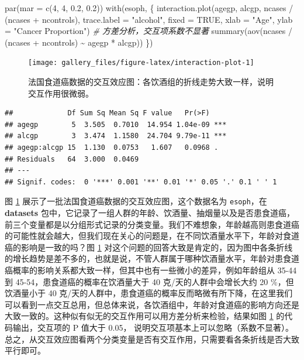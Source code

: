 \documentclass[
  b5paper,
  UTF8,twoside]{book}
\newenvironment{Shaded}{\begin{snugshade}}{\end{snugshade}}
\newcommand{\AttributeTok}[1]{\textcolor[rgb]{0.77,0.63,0.00}{#1}}
\newcommand{\CommentTok}[1]{\textcolor[rgb]{0.56,0.35,0.01}{\textit{#1}}}
\newcommand{\ConstantTok}[1]{\textcolor[rgb]{0.00,0.00,0.00}{#1}}
\newcommand{\DecValTok}[1]{\textcolor[rgb]{0.00,0.00,0.81}{#1}}
\newcommand{\FloatTok}[1]{\textcolor[rgb]{0.00,0.00,0.81}{#1}}
\newcommand{\FunctionTok}[1]{\textcolor[rgb]{0.00,0.00,0.00}{#1}}
\newcommand{\NormalTok}[1]{#1}
\newcommand{\SpecialCharTok}[1]{\textcolor[rgb]{0.00,0.00,0.00}{#1}}
\newcommand{\StringTok}[1]{\textcolor[rgb]{0.31,0.60,0.02}{#1}}
\begin{document}
\begin{Shaded}
\begin{Highlighting}[]
\FunctionTok{par}\NormalTok{(}\AttributeTok{mar =} \FunctionTok{c}\NormalTok{(}\DecValTok{4}\NormalTok{, }\DecValTok{4}\NormalTok{, }\FloatTok{0.2}\NormalTok{, }\FloatTok{0.2}\NormalTok{))}
\FunctionTok{with}\NormalTok{(esoph, \{}
  \FunctionTok{interaction.plot}\NormalTok{(agegp, alcgp, ncases }\SpecialCharTok{/}\NormalTok{ (ncases }\SpecialCharTok{+}\NormalTok{ ncontrols), }\AttributeTok{trace.label =} \StringTok{"alcohol"}\NormalTok{,}
                   \AttributeTok{fixed =} \ConstantTok{TRUE}\NormalTok{, }\AttributeTok{xlab =} \StringTok{"Age"}\NormalTok{, }\AttributeTok{ylab =} \StringTok{"Cancer Proportion"}\NormalTok{)}
  \CommentTok{\# 方差分析，交互项系数不显著}
  \FunctionTok{summary}\NormalTok{(}\FunctionTok{aov}\NormalTok{(ncases }\SpecialCharTok{/}\NormalTok{ (ncases }\SpecialCharTok{+}\NormalTok{ ncontrols) }\SpecialCharTok{\textasciitilde{}}\NormalTok{ agegp }\SpecialCharTok{*}\NormalTok{ alcgp))}
\NormalTok{\})}
\end{Highlighting}
\end{Shaded}

\begin{figure}

{\centering \texttt{[image: gallery\_files/figure-latex/interaction-plot-1]} 

}

\caption[法国食道癌数据的交互效应图]{法国食道癌数据的交互效应图：各饮酒组的折线走势大致一样，说明交互作用很微弱。}\label{fig:interaction-plot}
\end{figure}

\begin{verbatim}
##             Df Sum Sq Mean Sq F value   Pr(>F)    
## agegp        5  3.505  0.7010  14.954 1.04e-09 ***
## alcgp        3  3.474  1.1580  24.704 9.79e-11 ***
## agegp:alcgp 15  1.130  0.0753   1.607   0.0968 .  
## Residuals   64  3.000  0.0469                     
## ---
## Signif. codes:  0 '***' 0.001 '**' 0.01 '*' 0.05 '.' 0.1 ' ' 1
\end{verbatim}

图 \ref{fig:interaction-plot}
展示了一批法国食道癌数据的交互效应图，这个数据名为 \texttt{esoph}，在 \textbf{datasets} 包中，它记录了一组人群的年龄、饮酒量、抽烟量以及是否患食道癌，前三个变量都是以分组形式记录的分类变量。我们不难想象，年龄越高则患食道癌的可能性就会越大，但我们现在关心的问题是，在不同饮酒量水平下，年龄对食道癌的影响是一致的吗？图 \ref{fig:interaction-plot}
对这个问题的回答大致是肯定的，因为图中各条折线的增长趋势是差不多的，也就是说，不管人群属于哪种饮酒量水平，年龄对患食道癌概率的影响关系都大致一样，但其中也有一些微小的差异，例如年龄组从 35-44 到 45-54，患食道癌的概率在饮酒量大于 40 克/天的人群中会增长大约 20 \%，但饮酒量小于 40 克/天的人群中，患食道癌的概率反而略微有所下降，在这里我们可以看到一点交互总用，但总体来说，各饮酒组中，年龄对食道癌的影响方向还是大致一致的。这种似有似无的交互作用可以用方差分析来检验，结果如图 \ref{fig:interaction-plot}
的代码输出，交互项的 P 值大于 0.05，
说明交互项基本上可以忽略（系数不显著）。总之，从交互效应图看两个分类变量是否有交互作用，只需要看各条折线是否大致平行即可。
\end{document}
